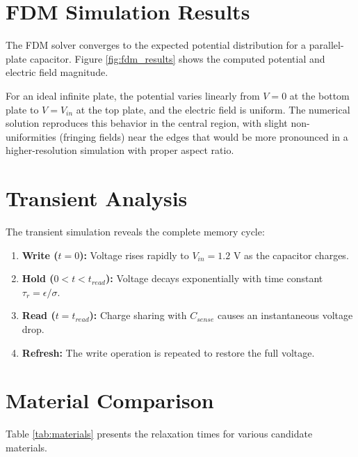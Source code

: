 \documentclass[12pt,a4paper]{report}
\begin{document}
\section{FDM Simulation Results}

The FDM solver converges to the expected potential distribution for a parallel-plate capacitor. Figure \ref{fig:fdm_results} shows the computed potential and electric field magnitude.

For an ideal infinite plate, the potential varies linearly from $V = 0$ at the bottom plate to $V = V_{in}$ at the top plate, and the electric field is uniform. The numerical solution reproduces this behavior in the central region, with slight non-uniformities (fringing fields) near the edges that would be more pronounced in a higher-resolution simulation with proper aspect ratio.

\section{Transient Analysis}

The transient simulation reveals the complete memory cycle:

\begin{enumerate}
    \item \textbf{Write ($t = 0$):} Voltage rises rapidly to $V_{in} = 1.2$ V as the capacitor charges.
    \item \textbf{Hold ($0 < t < t_{read}$):} Voltage decays exponentially with time constant $\tau_r = \epsilon/\sigma$.
    \item \textbf{Read ($t = t_{read}$):} Charge sharing with $C_{sense}$ causes an instantaneous voltage drop.
    \item \textbf{Refresh:} The write operation is repeated to restore the full voltage.
\end{enumerate}

\section{Material Comparison}

Table \ref{tab:materials} presents the relaxation times for various candidate materials.
\end{document}
